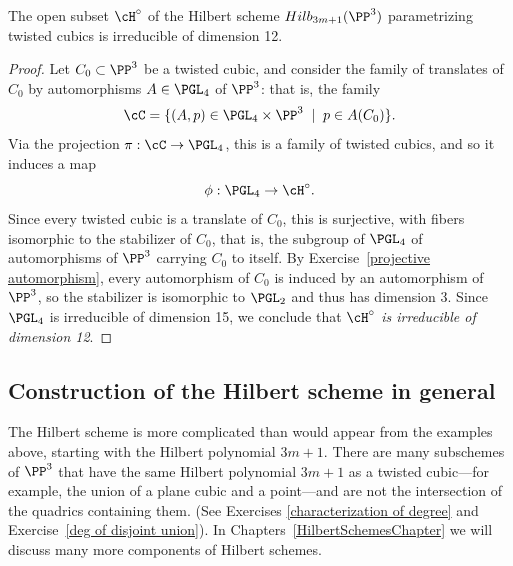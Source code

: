 

\begin{proposition}\label{hilb of twisted cubics}
The open subset $\cH^\circ$ of the Hilbert scheme $Hilb_{3m+1}(\PP^3)$ parametrizing twisted cubics is irreducible of dimension 12.
\end{proposition}

\begin{proof}  Let $C_0 \subset \PP^3$ be a twisted cubic, and consider the family of translates of $C_0$ by automorphisms $A \in \PGL_4$ of $\PP^3$: that is, the family
$$
\cC = \{ (A, p) \in \PGL_4 \times \PP^3 \; \mid \; p \in A(C_0) \}.
$$
Via the projection $\pi : \cC \to \PGL_4$, this is a family of twisted cubics, and so it induces a map
$$
\phi : \PGL_4 \to \cH^\circ.
$$
Since every twisted cubic is a translate of $C_0$, this is surjective, with fibers isomorphic to the stabilizer of $C_0$, that is, the subgroup of $\PGL_4$ of automorphisms of $\PP^3$ carrying $C_0$ to itself. By Exercise~\ref{projective automorphism}, every automorphism of $C_{0}$ is induced by an automorphism of $\PP^{3}$, so the stabilizer is isomorphic to $\PGL_2$ and  thus has dimension 3. Since $\PGL_4$ is irreducible of dimension 15, we conclude that \emph{$\cH^\circ$ is irreducible of dimension 12}.
\end{proof}


\subsection{Construction of the Hilbert scheme in general}\label{hilb construction}

The Hilbert scheme is more complicated than would appear from the examples above, starting with the Hilbert polynomial $3m+1$. There are many subschemes of $\PP^3$ that have the same Hilbert polynomial $3m+1$ as a twisted cubic---for example, the union of a plane cubic and a point---and are not the intersection of the quadrics containing them. (See Exercises \ref{characterization of degree} and Exercise~\ref{deg of disjoint union}). In Chapters~\ref{HilbertSchemesChapter} we will discuss many more components of Hilbert schemes.

